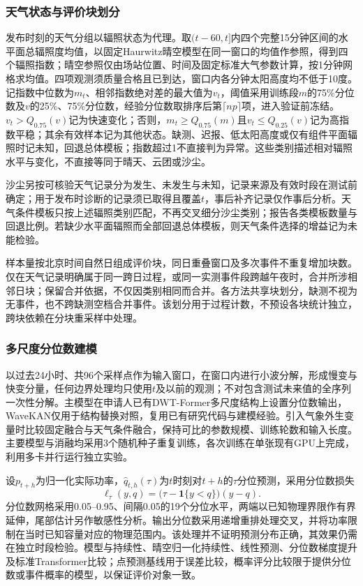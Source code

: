 \subsubsection{天气状态与评价块划分}
发布时刻的天气分组以辐照状态为代理。取$(t-60,t]$内四个完整15分钟区间的水平面总辐照度均值，以固定Haurwitz晴空模型在同一窗口的均值作参照，得到四个辐照指数；晴空参照仅由场站位置、时间及固定标准大气参数计算，按1分钟网格求均值。四项观测须质量合格且已到达，窗口内各分钟太阳高度均不低于10度。记指数中位数为$m_t$、相邻指数绝对差的最大值为$v_t$，阈值采用训练段$m$的75\%分位数及$v$的25\%、75\%分位数，经验分位数取排序后第$\lceil np\rceil$项，进入验证前冻结。$v_t>Q_{0.75}(v)$记为快速变化；否则，$m_t\geq Q_{0.75}(m)$且$v_t\leq Q_{0.25}(v)$记为高指数平稳；其余有效样本记为其他状态。缺测、迟报、低太阳高度或仅有组件平面辐照时记未知，回退总体模板；指数超过1不直接判为异常。这些类别描述相对辐照水平与变化，不直接等同于晴天、云团或沙尘。

沙尘另按可核验天气记录分为发生、未发生与未知，记录来源及有效时段在测试前确定；用于发布时诊断的记录须已取得且覆盖$t$，事后补齐记录仅作事后分析。天气条件模板只按上述辐照类别匹配，不再交叉细分沙尘类别；报告各类模板数量与回退比例。若缺少水平面辐照而全部回退总体模板，则天气条件选择的增益记为未能检验。

样本量按北京时间自然日组成评价块，同日重叠窗口及多次事件不重复增加块数。仅在天气记录明确属于同一跨日过程，或同一实测事件段跨越午夜时，合并所涉相邻日块；保留合并依据，不仅因类别相同而合并。各方法共享块划分，缺测不视为无事件，也不跨缺测空档合并事件。该划分用于过程计数，不预设各块统计独立，跨块依赖在分块重采样中处理。

\subsubsection{多尺度分位数建模}
以过去24小时、共96个采样点作为输入窗口，在窗口内进行小波分解，形成慢变与快变分量，任何边界处理均只使用$t$及以前的观测；不对包含测试未来值的全序列一次性分解。主模型在申请人已有DWT-Former多尺度结构上设置分位数输出，WaveKAN仅用于结构替换对照，复用已有研究代码与建模经验。引入气象外生变量时比较固定融合与天气条件融合，保持可比的参数规模、训练轮数和输入长度。主要模型与消融均采用3个随机种子重复训练，各次训练在单张现有GPU上完成，利用多卡并行运行独立实验。

设$p_{t+h}$为归一化实际功率，$\widehat q_{t,h}(\tau)$为$t$时刻对$t+h$的$\tau$分位预测，采用分位数损失
\[
\ell_\tau(y,q)=\bigl(\tau-\mathbf{1}\{y<q\}\bigr)(y-q).
\]
分位数网格采用0.05--0.95、间隔0.05的19个分位水平，两端以已知物理界限作有界延伸，尾部估计另作敏感性分析。输出分位数采用递增重排处理交叉，并将功率限制在当时已知容量对应的物理范围内。该处理并不证明预测分布正确，其效果仍需在独立时段检验。模型与持续性、晴空归一化持续性、线性预测、分位数梯度提升及标准Transformer比较；点预测基线用于误差比较，概率评分比较限于提供分位数或事件概率的模型，以保证评价对象一致。

